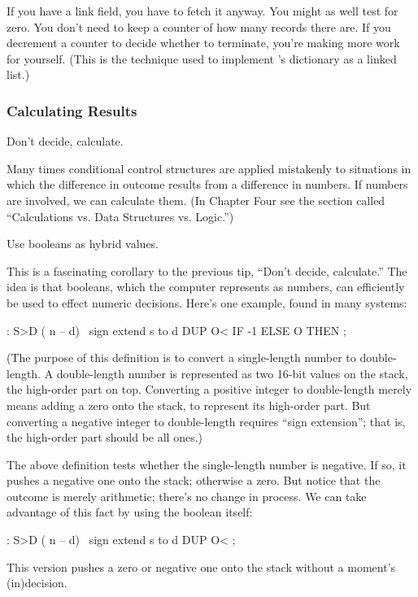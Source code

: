 If you have a link field, you have to fetch it anyway. You might as
well test for zero. You don't need to keep a counter of how many records
there are. If you decrement a counter to decide whether to terminate,
you're making more work for yourself. (This is the technique used to
implement \Forth{}'s dictionary as a linked list.)

\subsubsection{Calculating Results}

\begin{tip}
Don't decide, calculate.
\end{tip}
Many times conditional control structures are applied mistakenly to
situations in which the difference in outcome results from a difference in
numbers. If numbers are involved, we can calculate them. (In Chapter
Four see the section called ``Calculations vs. Data Structures vs. Logic.'')

\begin{tip}
Use booleans as hybrid values.
\end{tip}
This is a fascinating corollary to the previous tip, ``Don't decide,
calculate.'' The idea is that booleans, which the computer represents as
numbers, can efficiently be used to effect numeric decisions. Here's one
example, found in many \Forth{} systems:

\begin{Code}
: S>D  ( n -- d)  \ sign extend s to d
     DUP O<  IF -1  ELSE  O THEN ;
\end{Code}
(The purpose of this definition is to convert a single-length number to
double-length. A double-length number is represented as two 16-bit
values on the stack, the high-order part on top. Converting a positive
integer to double-length merely means adding a zero onto the stack, to
represent its high-order part. But converting a negative integer to
double-length requires ``sign extension''; that is, the high-order part
should be all ones.)

The above definition tests whether the single-length number is
negative. If so, it pushes a negative one onto the stack; otherwise a zero.
But notice that the outcome is merely arithmetic; there's no change
in process. We can take advantage of this fact by using the boolean itself:

\begin{Code}
: S>D  ( n -- d)  \ sign extend s to d
     DUP  O< ;
\end{Code}
This version pushes a zero or negative one onto the stack without a
moment's (in)decision.

